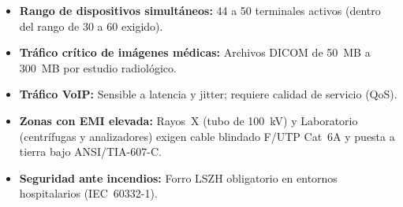 \begin{itemize}[leftmargin=*]
    \item \textbf{Rango de dispositivos simultáneos:} 44 a 50 terminales activos (dentro del rango de 30 a 60 exigido).
    \item \textbf{Tráfico crítico de imágenes médicas:} Archivos DICOM de 50~MB a 300~MB por estudio radiológico.
    \item \textbf{Tráfico VoIP:} Sensible a latencia y jitter; requiere calidad de servicio (QoS).
    \item \textbf{Zonas con EMI elevada:} Rayos~X (tubo de 100~kV) y Laboratorio (centrífugas y analizadores) exigen cable blindado F/UTP Cat~6A y puesta a tierra bajo ANSI/TIA-607-C.
    \item \textbf{Seguridad ante incendios:} Forro LSZH obligatorio en entornos hospitalarios (IEC~60332-1).
\end{itemize}
